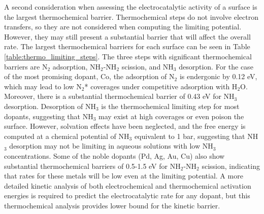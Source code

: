 

A second consideration when assessing the electrocatalytic activity of a surface is the largest thermochemical barrier. Thermochemical steps do not involve electron transfers, so they are not considered when computing the limiting potential. However, they may still present a substantial barrier that will affect the overall rate. The largest thermochemical barriers for each surface can be seen in Table \ref{table:thermo_limiting_steps}. The three steps with significant thermochemical barriers are N$_2$ adsorption, NH$_2$-NH$_2$ scission, and NH$_3$ desorption. For the case of the most promising dopant, Co, 
the adsorption of N$_2$ is endergonic by 0.12 eV, which may lead to low N$_2$* coverages under competitive adsorption with H$_2$O. Moreover, there is a substantial thermochemical barrier of 0.43 eV for NH$_3$ desorption. Desorption of NH$_3$ is the thermochemical limiting step for most dopants, suggesting that NH$_3$ may exist at high coverages or even poison the surface. However, solvation effects have been neglected, and the free energy is computed at a chemical potential of NH$_3$ equivalent to 1 bar, suggesting that NH$_3$ desorption may not be limiting in aqueous solutions with low NH$_3$ concentrations. Some of the noble dopants (Pd, Ag, Au, Cu) also show substantial thermochemical barriers of 0.5-1.5 eV for NH$_2$-NH$_2$ scission, indicating that rates for these metals will be low even at the limiting potential. A more detailed kinetic analysis of both electrochemical and thermochemical activation energies is required to predict the electrocatalytic rate for any dopant, but this thermochemical analysis provides lower bound for the kinetic barrier.


